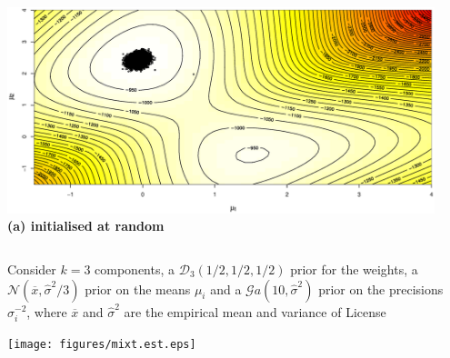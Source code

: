 \begin{slide}
\end{slide}\begin{slide}

\begin{columns}
\includegraphics[width=\textwidth,height=6cm]{figures/g2n2d1.eps}\\
{\bf (a) initialised at random}
\end{columns}

\end{slide}\begin{slide}

Consider $k=3$ components, a $\mathscr{D}_3(1/2,1/2,1/2)$ prior for the weights,
a $\mathscr{N}(\overline{x},\hat\sigma^2/3)$
prior on the means $\mu_i$ and a
$\mathscr{G}a(10,\hat\sigma^2)$ prior on the precisions
$\sigma_i^{-2}$, where $\overline{x}$ and $\hat\sigma^2$ are the
empirical mean and variance of {\sf License}

\pause
\centerline{\texttt{[image: figures/mixt.est.eps]}}

\end{slide}\begin{slide}


\end{slide}
